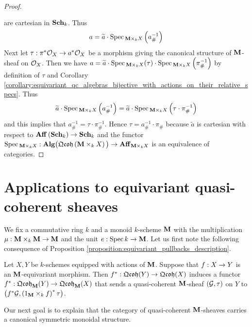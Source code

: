 \begin{proof}
\begin{center}
\end{center}
are cartesian in $\mathbf{Sch}_k$. Thus
$$a = \widetilde{a}\cdot \mathrm{Spec}\,_{\mathbf{M}\times_kX}\left(a_{\#}^{-1}\right)$$
Next let $\tau:\pi^*{\mathcal O}_X\rightarrow a^*{\mathcal O}_X$ be a morphism giving the canonical structure of $\mathbf{M}$-sheaf on ${\mathcal O}_X$. Then we have $a = \widetilde{a}\cdot \mathrm{Spec}\,_{\mathbf{M}\times_kX}(\tau) \cdot \mathrm{Spec}\,_{\mathbf{M}\times_kX}\left(\pi_{\#}^{-1}\right)$ by definition of $\tau$ and Corollary \ref{corollary:equivariant_qc_algebras_bijective_with_actions_on_their_relative_specs}. Thus
$$\widetilde{a}\cdot \mathrm{Spec}\,_{\mathbf{M}\times_kX}\left(a_{\#}^{-1}\right) = \widetilde{a} \cdot \mathrm{Spec}\,_{\mathbf{M}\times_kX}\left(\tau\cdot \pi_{\#}^{-1}\right)$$
and this implies that $a_{\#}^{-1} = \tau\cdot \pi_{\#}^{-1}$. Hence $\tau = a^{-1}_{\#}\cdot \pi_{\#}$ because $\widetilde{a}$ is cartesian with respect to $\mathbf{Aff}\left(\mathbf{Sch}_k\right)\rightarrow \mathbf{Sch}_k$ and the functor $\mathrm{Spec}\,_{\mathbf{M}\times_kX}:\mathbf{Alg}\big(\mathfrak{Qcoh}\left(\mathbf{M}\times_kX\right)\big)\rightarrow \mathbf{Aff}_{\mathbf{M}\times_kX}$ is an equivalence of categories.
\end{proof}

\section{Applications to equivariant quasi-coherent sheaves}
\noindent
We fix a commutative ring $k$ and a monoid $k$-scheme $\mathbf{M}$ with the multiplication $\mu:\mathbf{M}\times_k\mathbf{M}\rightarrow \mathbf{M}$ and the unit $e:\mathrm{Spec}\, k\rightarrow \mathbf{M}$. Let us first note the following consequence of Proposition \ref{proposition:equivariant_pullbacks_description}.

\begin{corollary}\label{corollary:pullbacks_of_equivariant_sheaves}
Let $X,Y$ be $k$-schemes equipped with actions of $\mathbf{M}$. Suppose that $f:X\rightarrow Y$ is an $\mathbf{M}$-equivariant morphism. Then $f^*:\mathfrak{Qcoh}(Y)\rightarrow \mathfrak{Qcoh}(X)$ induces a functor $f^*:\mathfrak{Qcoh}_{\mathbf{M}}(Y)\rightarrow \mathfrak{Qcoh}_{\mathbf{M}}(X)$ that sends a quasi-coherent $\mathbf{M}$-sheaf $({\mathcal G},\tau)$ on $Y$ to $\big(f^*{\mathcal G},\left(1_{\mathbf{M}}\times_k f\right)^*\tau\big)$.
\end{corollary}
\noindent
Our next goal is to explain that the category of quasi-coherent $\mathbf{M}$-sheaves carries a canonical symmetric monoidal structure. 

